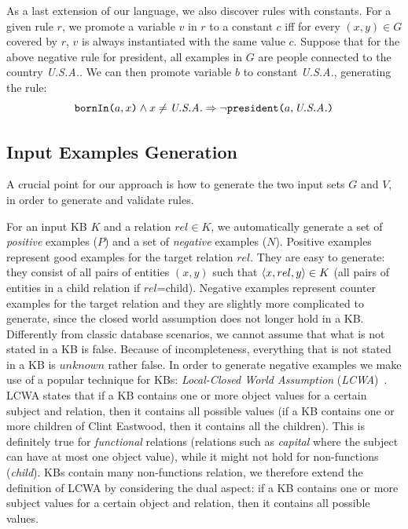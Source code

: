 As a last extension of our language, we also discover rules with constants. For a given rule $r$, we promote a variable $v$ in $r$ to a constant $c$ iff for every $(x,y) \in G$ covered by $r$, $v$ is always instantiated with the same value $c$. Suppose that for the above negative rule for president, all examples in $G$ are people connected to the country \textit{U.S.A.}. We can then promote variable $b$ to constant \textit{U.S.A.}, generating the rule:
$$ \texttt{bornIn(}a,x\texttt{)} \wedge x \neq \emph{U.S.A.} \Rightarrow \neg \texttt{president(}a,\emph{U.S.A.}\texttt{)} $$



\subsection{Input Examples Generation} \label{sec:examples_gen}
A crucial point for our approach is how to generate the two input sets $G$ and $V$, in order to generate and validate rules. 

For an input KB $K$ and a relation $rel \in K$, we automatically generate a set of \emph{positive} examples ($P$) and a set of \emph{negative} examples ($N$).  Positive examples represent good examples for the target relation $rel$. They are easy to generate: they consist of all pairs of entities $(x,y)$ such that $\langle x,rel,y\rangle \in K$ (all pairs of entities in a child relation if $rel$=child). Negative examples represent counter examples for the target relation and they are slightly more complicated to generate, since the closed world assumption does not longer hold in a KB. Differently from classic database scenarios, we cannot assume that what is not stated in a KB is false. Because of incompleteness, everything that is not stated in a KB is $unknown$ rather false. In order to generate negative examples we make use of a popular technique for KBs: \emph{Local-Closed World Assumption} (\emph{LCWA})~\cite{dong2014knowledge,galarraga2015fast}. LCWA states that if a KB contains one or more object values for a certain subject and relation, then it contains all possible values (if a KB contains one or more children of Clint Eastwood, then it contains all the children). This is definitely true for \emph{functional} relations (relations such as \emph{capital} where the subject can have at most one object value), while it might not hold for non-functions (\emph{child}). KBs contain many non-functions relation, we therefore extend the definition of LCWA by considering the dual aspect: if a KB contains one or more subject values for a certain object and relation, then it contains all possible values. 

